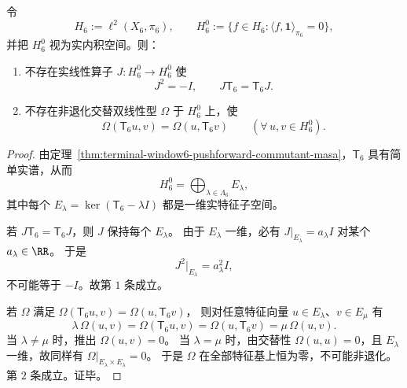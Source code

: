 \begin{theorem}\label{thm:window6-no-equivariant-complex-or-symplectic-polarization}
令
\[
H_6:=\ell^2(X_6,\pi_6),\qquad
H_6^0:=\{f\in H_6:\langle f,\mathbf 1\rangle_{\pi_6}=0\},
\]
并把 \(H_6^0\) 视为实内积空间。则：
\begin{enumerate}
  \item 不存在实线性算子 \(J:H_6^0\to H_6^0\) 使
  \[
  J^2=-I,\qquad J\mathsf T_6=\mathsf T_6J.
  \]
  \item 不存在非退化交替双线性型 \(\Omega\) 于 \(H_6^0\) 上，使
  \[
  \Omega(\mathsf T_6u,v)=\Omega(u,\mathsf T_6v)\qquad(\forall\,u,v\in H_6^0).
  \]
\end{enumerate}
\end{theorem}

\begin{proof}
由定理~\ref{thm:terminal-window6-pushforward-commutant-masa}，\(\mathsf T_6\) 具有简单实谱，从而
\[
H_6^0=\bigoplus_{\lambda\in\Lambda_6}E_\lambda,
\]
其中每个 \(E_\lambda=\ker(\mathsf T_6-\lambda I)\) 都是一维实特征子空间。

若 \(J\mathsf T_6=\mathsf T_6J\)，则 \(J\) 保持每个 \(E_\lambda\)。
由于 \(E_\lambda\) 一维，必有 \(J|_{E_\lambda}=a_\lambda I\) 对某个 \(a_\lambda\in\RR\)。
于是
\[
J^2|_{E_\lambda}=a_\lambda^2 I,
\]
不可能等于 \(-I\)。故第 \(1\) 条成立。

若 \(\Omega\) 满足
\(
\Omega(\mathsf T_6u,v)=\Omega(u,\mathsf T_6v)
\)，
则对任意特征向量 \(u\in E_\lambda\)、\(v\in E_\mu\) 有
\[
\lambda\,\Omega(u,v)=\Omega(\mathsf T_6u,v)=\Omega(u,\mathsf T_6v)=\mu\,\Omega(u,v).
\]
当 \(\lambda\neq\mu\) 时，推出 \(\Omega(u,v)=0\)。
当 \(\lambda=\mu\) 时，由交替性 \(\Omega(u,u)=0\)，且 \(E_\lambda\) 一维，故同样有 \(\Omega|_{E_\lambda\times E_\lambda}=0\)。
于是 \(\Omega\) 在全部特征基上恒为零，不可能非退化。第 \(2\) 条成立。证毕。
\end{proof}

